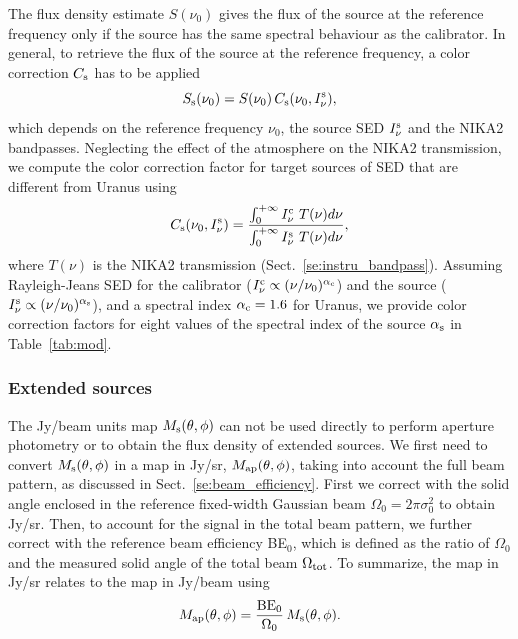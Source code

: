 The flux density estimate $S(\nu_{0})$ gives the
flux of the source at the reference frequency only if the source has
the same spectral behaviour as the calibrator. In general, to retrieve the
flux of the source at the reference frequency, a color correction
$C_{\rm{s}}$ has to be applied
\begin{equation}
S_{\rm{s}}(\nu_{0}) = S(\nu_{0}) \,  C_{\rm{s}}(\nu_{0}, I_\nu^{\rm{s}}),
\end{equation}
which depends on the reference frequency $\nu_{0}$, the source
SED $I_\nu^{\rm{s}}$ and the NIKA2 bandpasses.
Neglecting the effect of the atmosphere on the NIKA2 transmission, we
compute the color correction factor for target sources of SED that are
different from Uranus using
\begin{equation}
  C_{\rm{s}}(\nu_{0}, I_\nu^{\rm{s}}) = \frac{\int_{0}^{+\infty} I_\nu^{\rm{c}}~T({\nu}) d\nu}{ \int_{0}^{+\infty} I_\nu^{\rm{s}}~ T({\nu}) d\nu},
    \label{eq:color_correction}
\end{equation}
where $T({\nu})$ is the NIKA2 transmission
(Sect.~\ref{se:instru_bandpass}).
Assuming Rayleigh-Jeans SED for the calibrator
($I_\nu^{\rm{c}} \propto (\nu/\nu_0)^{\alpha_{\rm{c}}}$) and the source
($I_\nu^{\rm{s}} \propto (\nu/\nu_0)^{\alpha_{\rm{s}}}$), and a
spectral index $\alpha_{\rm{c}} = 1.6$ for Uranus, we provide color
correction factors for eight values of the spectral index of the
source $\alpha_{\rm{s}}$ in Table~\ref{tab:mod}.


\subsubsection{Extended sources}
\label{se:extended_source_calib}

{\lp The Jy/beam units map $M_{\rm{s}}(\theta, \phi)$ can not be used
directly to perform aperture photometry or to obtain the flux density
of extended sources. We first need to convert
$M_{\rm{s}}(\theta, \phi)$ in a map in Jy/sr,
$M_{\rm{ap}}(\theta, \phi)$, taking into account the full beam
pattern, as discussed in Sect.~\ref{se:beam_efficiency}. 
First we correct with the solid angle enclosed in the
reference fixed-width Gaussian beam $\Omega_{0} = 2\pi \sigma_0^2$ to
obtain Jy/sr. Then, to account for the signal in the total beam
pattern, we further correct with the reference beam
efficiency BE$_{0}$, which is defined as the ratio of 
$\Omega_{0}$ and the measured solid angle of the total
beam $\Omega_{\rm{tot}}$. To summarize, the map in Jy/sr relates to
the map in Jy/beam using
\begin{equation}
M_{\rm{ap}}(\theta, \phi) = \frac{\rm{BE}_{0}}{\Omega_{0}} \, M_{\rm{s}}(\theta, \phi).
\end{equation}}

